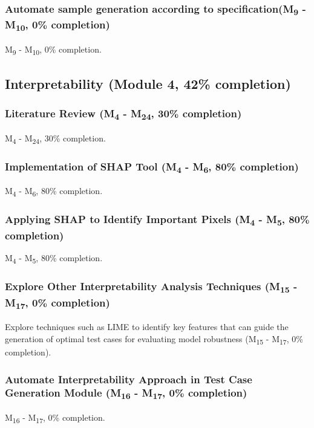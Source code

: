 \subsubsection{Automate sample generation according to specification(M\textsubscript{9} - M\textsubscript{10}, 0\% completion)}
M\textsubscript{9} - M\textsubscript{10}, 0\% completion.

\subsection{Interpretability (Module 4, 42\% completion)}
\subsubsection{Literature Review (M\textsubscript{4} - M\textsubscript{24}, 30\% completion)}
M\textsubscript{4} - M\textsubscript{24}, 30\% completion.

\subsubsection{Implementation of SHAP Tool (M\textsubscript{4} - M\textsubscript{6}, 80\% completion)}
M\textsubscript{4} - M\textsubscript{6}, 80\% completion.

\subsubsection{Applying SHAP to Identify Important Pixels (M\textsubscript{4} - M\textsubscript{5}, 80\% completion)}
M\textsubscript{4} - M\textsubscript{5}, 80\% completion.

\subsubsection{Explore Other Interpretability Analysis Techniques (M\textsubscript{15} - M\textsubscript{17}, 0\% completion)}
Explore techniques such as LIME to identify key features that can guide the generation of optimal test cases for evaluating model robustness (M\textsubscript{15} - M\textsubscript{17}, 0\% completion).

\subsubsection{Automate Interpretability Approach in Test Case Generation Module (M\textsubscript{16} - M\textsubscript{17}, 0\% completion)}
M\textsubscript{16} - M\textsubscript{17}, 0\% completion.

